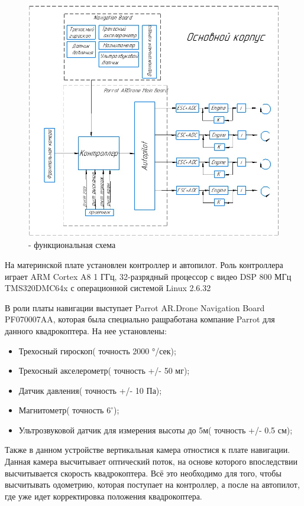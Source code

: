 \begin{figure}[H]
	\begin{center}
		\includegraphics[scale=0.9]{pics/FunCxem}
		\caption{- функциональная схема} 
		\label{pic:pic_1} %
	\end{center}
\end{figure}

\newpage

На материнской плате установлен контроллер и автопилот. Роль контроллера играет ARM Cortex A8 1 ГГц, 32-разрядный процессор с видео DSP 800 МГц TMS320DMC64x с операционной системой Linux 2.6.32                                                                                                                                

В роли платы навигации выступает Parrot AR.Drone Navigation Board PF070007AA, которая была специально ращработана компание Parrot для данного квадрокоптера. На нее установлены:
\begin{itemize}
\item Трехосный гироскоп( точность 2000 °/сек);
\item Трехосный акселерометр( точность +/- 50 мг);
\item Датчик давления( точность +/- 10 Па);
\item Магнитометр( точность $6^{\circ}$);
\item Ультрозвуковой датчик для измерения высоты до 5м( точность +/- 0.5 см);
\end{itemize}
Также в данном устройстве вертикальная камера отностися к плате навигации. Данная камера высчитывает оптический поток, на основе которого впоследствии высчитывается скорость квадрокоптера. Всё это необходимо для того, чтобы высчитывать одометрию, которая поступает на контроллер, а после на автопилот, где уже идет корректировка положения квадрокоптера.

